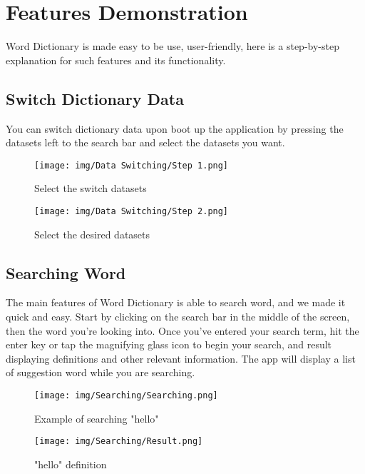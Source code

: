 \documentclass[sn-mathphys,Numbered]{sn-jnl}%
\begin{document}
\newpage

\section{Features Demonstration}

Word Dictionary is made easy to be use, user-friendly, here is a step-by-step explanation for such features and its functionality.

\subsection{Switch Dictionary Data}

You can switch dictionary data upon boot up the application by pressing the datasets left to the search bar and select the datasets you want.

\begin{figure}[!htb]
	\centering
	\begin{minipage}{0.47\textwidth}
		\texttt{[image: img/Data Switching/Step 1.png]}
		\caption*{Select the switch datasets}
	\end{minipage}\hfill
	\begin{minipage}{0.47\textwidth}
		\texttt{[image: img/Data Switching/Step 2.png]}
		\caption*{Select the desired datasets}
	\end{minipage}
\end{figure}

\subsection{Searching Word}

The main features of Word Dictionary is able to search word, and we made it quick and easy. Start by clicking on the search bar in the middle of the screen, then the word you're looking into. Once you’ve entered your search term, hit the enter key or tap the magnifying glass icon to begin your search, and result displaying definitions and other relevant information. The app will display a list of suggestion word while you are searching.

\begin{figure}[!htb]
	\centering
	\begin{minipage}{0.47\textwidth}
	\texttt{[image: img/Searching/Searching.png]}
	\caption*{Example of searching "hello"}
	\end{minipage}\hfill
	\begin{minipage}{0.47\textwidth}
		\texttt{[image: img/Searching/Result.png]}
		\caption*{"hello" definition}
	\end{minipage}
\end{figure}
\end{document}
